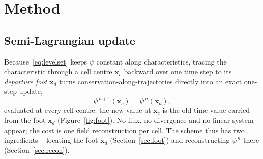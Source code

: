 \documentclass[preprint,3p,11pt]{elsarticle}
\newcommand{\psilev}{\psi}                       %
\newcommand{\xd}{\mathbf{x}_d}                    %
\newcommand{\xc}{\mathbf{x}_c}                    %
\begin{document}
\section{Method}
\label{sec:method}

\subsection{Semi-Lagrangian update}
Because~\eqref{eq:levelset} keeps $\psilev$ constant along characteristics, tracing the
characteristic through a cell centre $\xc$ backward over one time step to its
\emph{departure foot} $\xd$ turns conservation-along-trajectories directly into an exact
one-step update,
\begin{equation}
  \psilev^{\,n+1}(\xc) = \psilev^{\,n}(\xd),
  \label{eq:sl}
\end{equation}
evaluated at every cell centre: the new value at $\xc$ is the old-time value carried
from the foot $\xd$ (Figure~\ref{fig:foot}). No flux, no divergence and no linear system
appear; the cost is one field reconstruction per cell. The scheme thus has two
ingredients -- locating the foot $\xd$ (Section~\ref{sec:foot}) and reconstructing
$\psilev^{\,n}$ there (Section~\ref{sec:recon}).
\end{document}
